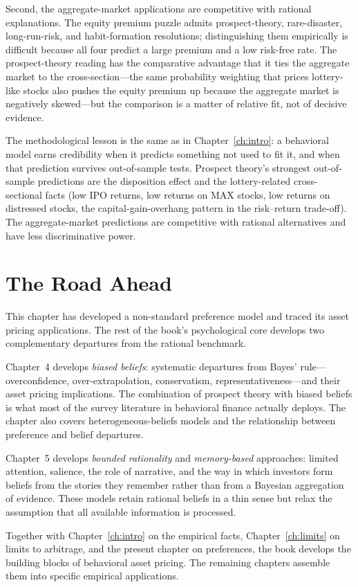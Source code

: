 Second, the aggregate-market applications are competitive with rational explanations. The equity premium puzzle admits prospect-theory, rare-disaster, long-run-risk, and habit-formation resolutions; distinguishing them empirically is difficult because all four predict a large premium and a low risk-free rate. The prospect-theory reading has the comparative advantage that it ties the aggregate market to the cross-section---the same probability weighting that prices lottery-like stocks also pushes the equity premium up because the aggregate market is negatively skewed---but the comparison is a matter of relative fit, not of decisive evidence.

The methodological lesson is the same as in Chapter~\ref{ch:intro}: a behavioral model earns credibility when it predicts something not used to fit it, and when that prediction survives out-of-sample tests. Prospect theory's strongest out-of-sample predictions are the disposition effect and the lottery-related cross-sectional facts (low IPO returns, low returns on MAX stocks, low returns on distressed stocks, the capital-gain-overhang pattern in the risk--return trade-off). The aggregate-market predictions are competitive with rational alternatives and have less discriminative power.

\section{The Road Ahead}
\label{sec:ptahead}

This chapter has developed a non-standard preference model and traced its asset pricing applications. The rest of the book's psychological core develops two complementary departures from the rational benchmark.

Chapter~4 develops \emph{biased beliefs}: systematic departures from Bayes' rule---overconfidence, over-extrapolation, conservatism, representativeness---and their asset pricing implications. The combination of prospect theory with biased beliefs is what most of the survey literature in behavioral finance actually deploys. The chapter also covers heterogeneous-beliefs models and the relationship between preference and belief departures.

Chapter~5 develops \emph{bounded rationality} and \emph{memory-based} approaches: limited attention, salience, the role of narrative, and the way in which investors form beliefs from the stories they remember rather than from a Bayesian aggregation of evidence. These models retain rational beliefs in a thin sense but relax the assumption that all available information is processed.

Together with Chapter~\ref{ch:intro} on the empirical facts, Chapter~\ref{ch:limits} on limits to arbitrage, and the present chapter on preferences, the book develops the building blocks of behavioral asset pricing. The remaining chapters assemble them into specific empirical applications.
